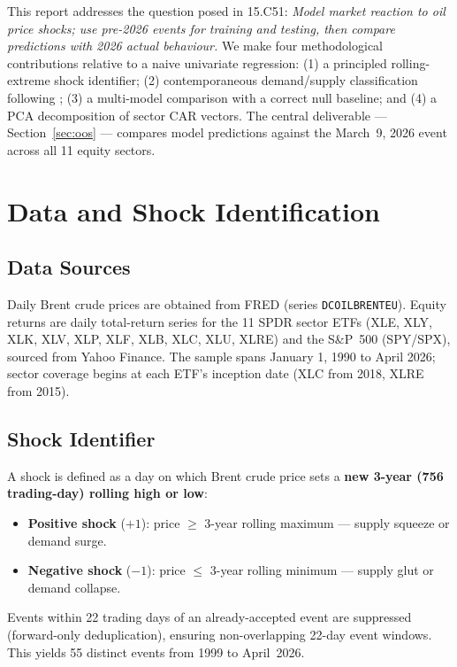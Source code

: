 \documentclass[11pt,a4paper]{article}
\begin{document}
This report addresses the question posed in 15.C51: \emph{Model market reaction to oil price shocks; use pre-2026 events for training and testing, then compare predictions with 2026 actual behaviour.} We make four methodological contributions relative to a naive univariate regression: (1) a principled rolling-extreme shock identifier; (2) contemporaneous demand/supply classification following \cite{kilian2009}; (3) a multi-model comparison with a correct null baseline; and (4) a PCA decomposition of sector CAR vectors. The central deliverable — Section~\ref{sec:oos} — compares model predictions against the March~9, 2026 event across all 11 equity sectors.

\section{Data and Shock Identification}

\subsection{Data Sources}

Daily Brent crude prices are obtained from FRED (series \texttt{DCOILBRENTEU}). Equity returns are daily total-return series for the 11 SPDR sector ETFs (XLE, XLY, XLK, XLV, XLP, XLF, XLB, XLC, XLU, XLRE) and the S\&P~500 (SPY/SPX), sourced from Yahoo Finance. The sample spans January 1, 1990 to April 2026; sector coverage begins at each ETF's inception date (XLC from 2018, XLRE from 2015).

\subsection{Shock Identifier}

A shock is defined as a day on which Brent crude price sets a \textbf{new 3-year (756 trading-day) rolling high or low}:
\begin{itemize}[noitemsep]
  \item \textbf{Positive shock} ($+1$): price $\geq$ 3-year rolling maximum — supply squeeze or demand surge.
  \item \textbf{Negative shock} ($-1$): price $\leq$ 3-year rolling minimum — supply glut or demand collapse.
\end{itemize}
Events within 22 trading days of an already-accepted event are suppressed (forward-only deduplication), ensuring non-overlapping 22-day event windows. This yields 55 distinct events from 1999 to April~2026.
\end{document}
